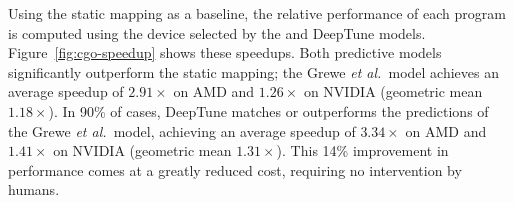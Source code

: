 Using the static mapping as a baseline, the relative performance of each program is computed using the device selected by the \citeauthor{Grewe2013} and DeepTune models. Figure~\ref{fig:cgo-speedup} shows these speedups. Both predictive models significantly outperform the static mapping; the Grewe \emph{et al.\ }model achieves an average speedup of $2.91\times$ on AMD and $1.26\times$ on NVIDIA (geometric mean $1.18\times$). In 90\% of cases, DeepTune matches or outperforms the predictions of the Grewe \emph{et al.\ }model, achieving an average speedup of $3.34\times$ on AMD and $1.41\times$ on NVIDIA (geometric mean $1.31\times$). This 14\% improvement in performance comes at a greatly reduced cost, requiring no intervention by humans.


